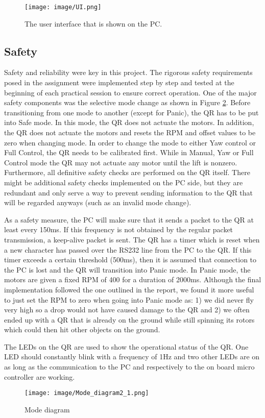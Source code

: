 \documentclass[a4paper]{article}
\begin{document}
\begin{figure}[h!]
  \centering
  \texttt{[image: image/UI.png]}
  \caption{The user interface that is shown on the PC.}
  \label{fig:ui}
\end{figure}

\subsection{Safety}
Safety and reliability were key in this project. The rigorous safety requirements posed in the assignment were implemented step by step and tested at the beginning of each practical session to ensure correct operation. One of the major safety components was the selective mode change as shown in Figure \ref{fig:modes}. Before transitioning from one mode to another (except for Panic), the QR has to be put into Safe mode. In this mode, the QR does not actuate the motors. In addition, the QR does not actuate the motors and resets the RPM and offset values to be zero when changing mode. In order to change the mode to either Yaw control or Full Control, the QR needs to be calibrated first. While in Manual, Yaw or Full Control mode the QR may not actuate any motor until the lift is nonzero. Furthermore, all definitive safety checks are performed on the QR itself. There might be additional safety checks implemented on the PC side, but they are redundant and only serve a way to prevent sending information to the QR that will be regarded anyways (such as an invalid mode change).

As a safety measure, the PC will make sure that it sends a packet to the QR at least every 150ms. If this frequency is not obtained by the regular packet transmission, a keep-alive packet is sent. The QR has a timer which is reset when a new character has passed over the RS232 line from the PC to the QR. If this timer exceeds a certain threshold (500ms), then it is assumed that connection to the PC is lost and the QR will transition into Panic mode. In Panic mode, the motors are given a fixed RPM of 400 for a duration of 2000ms. Although the final implementation followed the one outlined in the report, we found it more useful to just set the RPM to zero when going into Panic mode as: 1) we did never fly very high so a drop would not have caused damage to the QR and 2) we often ended up with a QR that is already on the ground while still spinning its rotors which could then hit other objects on the ground.

The LEDs on the QR are used to show the operational status of the QR. One LED should constantly blink with a frequency of 1Hz and two other LEDs are on as long as the communication to the PC and respectively to the on board micro controller are working. 
\begin{figure}[h!]
  \centering
  \texttt{[image: image/Mode\_diagram2\_1.png]}
  \caption{Mode diagram}
  \label{fig:modes}
\end{figure}
\end{document}
